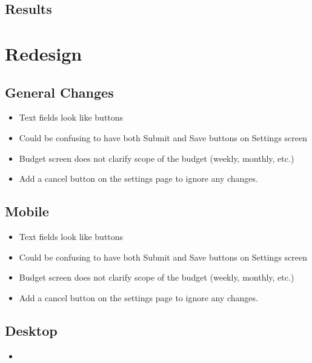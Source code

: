 \documentclass{chi2011}
\begin{document}
    \subsection{Results}

\section{Redesign}
\subsection{General Changes}
    \begin{itemize}
        \item Text fields look like buttons
        \item Could be confusing to have both Submit and Save buttons on Settings screen
        \item Budget screen does not clarify scope of the budget (weekly, monthly, etc.)
        \item Add a cancel button on the settings page to ignore any changes.
    \end{itemize}

\subsection{Mobile}
    \begin{itemize}
        \item Text fields look like buttons
        \item Could be confusing to have both Submit and Save buttons on Settings screen
        \item Budget screen does not clarify scope of the budget (weekly, monthly, etc.)
        \item Add a cancel button on the settings page to ignore any changes.
    \end{itemize}

    \subsection{Desktop}
    \begin{itemize}
        \item 
    \end{itemize}
\end{document}
